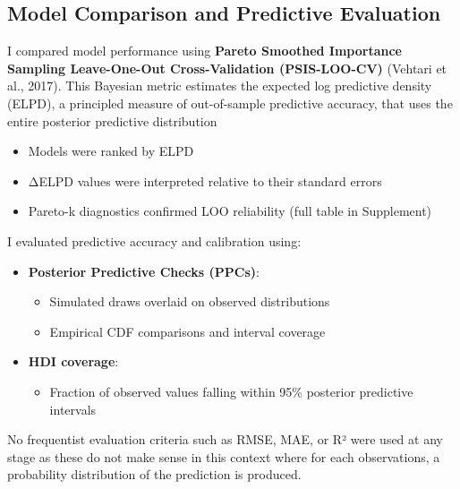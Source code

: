 \documentclass[
]{agujournal2019}
\providecommand{\tightlist}{%
  \setlength{\itemsep}{0pt}\setlength{\parskip}{0pt}}\usepackage{longtable,booktabs,array}
\begin{document}
\subsection{Model Comparison and Predictive
Evaluation}\label{model-comparison-and-predictive-evaluation}

I compared model performance using \textbf{Pareto Smoothed Importance
Sampling Leave-One-Out Cross-Validation (PSIS-LOO-CV)} (Vehtari et al.,
2017). This Bayesian metric estimates the expected log predictive
density (ELPD), a principled measure of out-of-sample predictive
accuracy, that uses the entire posterior predictive distribution

\begin{itemize}
\tightlist
\item
  Models were ranked by ELPD\\
\item
  ΔELPD values were interpreted relative to their standard errors\\
\item
  Pareto-k diagnostics confirmed LOO reliability (full table in
  Supplement)
\end{itemize}

I evaluated predictive accuracy and calibration using:

\begin{itemize}
\tightlist
\item
  \textbf{Posterior Predictive Checks (PPCs)}:

  \begin{itemize}
  \tightlist
  \item
    Simulated draws overlaid on observed distributions\\
  \item
    Empirical CDF comparisons and interval coverage
  \end{itemize}
\item
  \textbf{HDI coverage}:

  \begin{itemize}
  \tightlist
  \item
    Fraction of observed values falling within 95\% posterior predictive
    intervals
  \end{itemize}
\end{itemize}

No frequentist evaluation criteria such as RMSE, MAE, or R² were used at
any stage as these do not make sense in this context where for each
observations, a probability distribution of the prediction is produced.
\end{document}
